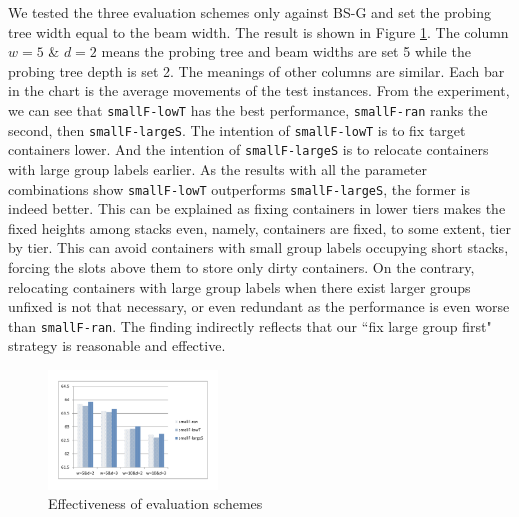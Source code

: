 \documentclass[review,3p,times,authoryear,12pt]{elsarticle}
\begin{document}
We tested the three evaluation schemes only against BS-G and set the probing tree width equal to the beam width. The result is shown in Figure \ref{fig7}. The column $w=5$ \& $d=2$ means the probing tree and beam widths are set 5 while the probing tree depth is set 2. The meanings of other columns are similar. Each bar in the chart is the average movements of the test instances. From the experiment, we can see that \texttt{smallF-lowT} has the best performance, \texttt{smallF-ran} ranks the second, then \texttt{smallF-largeS}. The intention of \texttt{smallF-lowT} is to fix target containers lower. And the intention of \texttt{smallF-largeS} is to relocate containers with large group labels earlier. As the results with all the parameter combinations show \texttt{smallF-lowT} outperforms \texttt{smallF-largeS}, the former is indeed better. This can be explained as fixing containers in lower tiers makes the fixed heights among stacks even, namely, containers are fixed, to some extent, tier by tier. This can avoid containers with small group labels occupying short stacks, forcing the slots above them to store only dirty containers. On the contrary, relocating containers with large group labels when there exist larger groups unfixed is not that necessary, or even redundant as the performance is even worse than \texttt{smallF-ran}. The finding indirectly reflects that our ``fix large group first" strategy is reasonable and effective.
\begin{figure}[htbp]
\centering
\includegraphics[width=0.4\textwidth]{fig7.pdf}
\caption{Effectiveness of evaluation schemes}
\label{fig7}
\end{figure}
\end{document}
